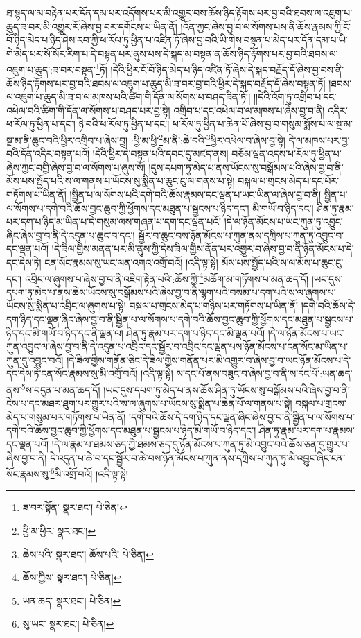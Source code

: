 ཐ་སྙད་ལ་མ་བརྟེན་པར་དོན་དམ་པར་འདོགས་པར་མི་འགྱུར་བས་ཆོས་ཉིད་རྟོགས་པར་བྱ་བའི་ཐབས་ལ་འཇུག་པ་ཆུད་ཟ་བར་མི་འགྱུར་རོ་ཞེས་བྱ་བར་དགོངས་པ་ཡིན་ནོ། །འོན་ཀྱང་ཞེས་བྱ་བ་ལ་སོགས་པས་ནི་ཆོས་རྣམས་ཀྱི་ངོ་བོ་ཉིད་མེད་པ་ཉིད་ཤེས་རབ་ཀྱི་ཕ་རོལ་ཏུ་ཕྱིན་པ་འཛིན་ཏོ་ཞེས་བྱ་བའི་ཡི་གེས་བསྟན་པ་མེད་པར་དོན་དམ་པ་ཡི་གེ་མེད་པར་སོ་སོར་རིག་པ་དེ་བསྟན་པར་ནུས་པས་དེ་སྐད་མ་བསྟན་ན་ཆོས་ཉིད་རྟོགས་པར་བྱ་བའི་ཐབས་ལ་འཇུག་པ་ཆུད་:ཟ་བར་བསྟན་\footnote{ཟ་བར་སྟོན་  སྣར་ཐང་།  པེ་ཅིན། }ཏོ། །དེའི་ཕྱིར་ངོ་བོ་ཉིད་མེད་པ་ཉིད་འཛིན་ཏོ་ཞེས་དེ་སྐད་བརྗོད་དོ་ཞེས་བྱ་བས་ནི་ཆོས་ཉིད་རྟོགས་པར་བྱ་བའི་ཐབས་ལ་འཇུག་པ་ཆུད་མི་ཟ་བར་བྱ་བའི་ཕྱིར་དེ་སྐད་བརྗོད་དོ་ཞེས་བསྟན་ཏོ། །ཐབས་ལ་འཇུག་པ་ཆུད་མི་ཟ་བ་ལ་མཁས་པའི་ཚིག་གི་དོན་ལ་སོགས་པ་བཤད་ཟིན་ཏོ།། །།དེའི་འོག་ཏུ་འགྲིབ་པ་དང་འཕེལ་བའི་ཚིག་གི་དོན་ལ་སོགས་པ་བཤད་པར་བྱ་སྟེ། འགྲིབ་པ་དང་འཕེལ་བ་ལ་མཁས་པ་ཞེས་བྱ་བ་ནི། འདིར་ཕ་རོལ་ཏུ་ཕྱིན་པ་དང་། ཉེ་བའི་ཕ་རོལ་ཏུ་ཕྱིན་པ་དང་། ཕ་རོལ་ཏུ་ཕྱིན་པ་ཆེན་པོ་ཞེས་བྱ་བ་གསུམ་སྨོས་པ་ལ་སྔ་མ་སྔ་མ་ནི་ཆུང་བའི་ཕྱིར་འགྲིབ་པ་ཞེས་བྱ། :ཕྱི་མ་ཕྱི་\footnote{ཕྱི་མ་ཕྱིར་  སྣར་ཐང་། }མ་ནི་:ཆེ་བའི་\footnote{ཆེས་པའི་  སྣར་ཐང་། ཆོས་པའི་  པེ་ཅིན། }ཕྱིར་འཕེལ་བ་ཞེས་བྱ་སྟེ། དེ་ལ་མཁས་པར་བྱ་བའི་དོན་འདིར་བསྟན་པའོ། །དེའི་ཕྱིར་དེ་བསྟན་པའི་དབང་དུ་མཛད་ནས། བཅོམ་ལྡན་འདས་ཕ་རོལ་ཏུ་ཕྱིན་པ་ཞེས་ཀྱང་བགྱི་ཞེས་བྱ་བ་ལ་སོགས་པ་ཞུས་སོ། །དུས་དཔག་ཏུ་མེད་པ་ནས་ཡོངས་སུ་བསྒོམས་པའི་ཞེས་བྱ་བ་ནི་མོས་པས་སྤྱོད་པའི་ས་ལ་གནས་པ་ཡོངས་སུ་སྨིན་པ་ཆུང་ངུ་ལ་གནས་པ་སྟེ། བསྐལ་པ་གྲངས་མེད་པ་དང་པོར་གཏོགས་པ་ཡིན་ནོ། །སྦྱིན་པ་ལ་སོགས་པའི་དགེ་བའི་ཆོས་རྣམས་དང་ལྡན་པ་ཡང་ཡིན་ལ་ཞེས་བྱ་བ་ནི། སྦྱིན་པ་ལ་སོགས་པ་དགེ་བའི་ཆོས་བྱང་ཆུབ་ཀྱི་ཕྱོགས་དང་མཐུན་པ་སྦྱངས་པ་ཉིད་དང་། མི་གཡོ་བ་ཉིད་དང་། ཤིན་ཏུ་རྣམ་པར་དག་པ་ཉིད་མ་ཡིན་པ་དེ་གསུམ་ལས་གཞན་པ་དག་དང་ལྡན་པའོ། །དེ་ལ་ཉོན་མོངས་པ་ཡང་ཀུན་ཏུ་འབྱུང་ཞིང་ཞེས་བྱ་བ་ནི་དེ་འདུན་པ་ཆུང་བ་དང་། སྦྱོར་བ་ཆུང་བས་ཉོན་མོངས་པ་ཀུན་ནས་དཀྲིས་པ་ཀུན་ཏུ་འབྱུང་བ་དང་ལྡན་པའོ། །དེ་ཟིལ་གྱིས་མནན་པར་མི་ནུས་ཀྱི་དེས་ཟིལ་གྱིས་ནོན་པར་འགྱུར་བ་ཞེས་བྱ་བ་ནི་ཉོན་མོངས་པ་དེ་དང་དེས་ཏེ། ངན་སོང་རྣམས་སུ་ཡང་ལན་འགའ་འགྲོ་བའོ། །འདི་ལྟ་སྟེ། མོས་པས་སྤྱོད་པའི་ས་ལ་མོས་པ་ཆུང་ངུ་དང་། འབྲིང་ལ་ཞུགས་པ་ཞེས་བྱ་བ་ནི་འཇིག་རྟེན་པའི་:ཆོས་ཀྱི་\footnote{ཆོས་ཀྱིས་  སྣར་ཐང་།  པེ་ཅིན། }མཆོག་མ་གཏོགས་པ་མན་ཆད་དོ། །ཡང་དུས་དཔག་ཏུ་མེད་པ་ནས་ཆེས་ཡོངས་སུ་བསྒོམས་པའི་ཞེས་བྱ་བ་ནི་ལྷག་པའི་བསམ་པ་དག་པའི་ས་ལ་ཞུགས་པ་ཡོངས་སུ་སྨིན་པ་འབྲིང་ལ་ཞུགས་པ་སྟེ། བསྐལ་པ་གྲངས་མེད་པ་གཉིས་པར་གཏོགས་པ་ཡིན་ནོ། །དགེ་བའི་ཆོས་དེ་དག་ཉིད་དང་ལྡན་ཞིང་ཞེས་བྱ་བ་ནི་སྦྱིན་པ་ལ་སོགས་པ་དགེ་བའི་ཆོས་བྱང་ཆུབ་ཀྱི་ཕྱོགས་དང་མཐུན་པ་སྦྱངས་པ་ཉིད་དང་མི་གཡོ་བ་ཉིད་དང་ནི་ལྡན་ལ། ཤིན་ཏུ་རྣམ་པར་དག་པ་ཉིད་དང་མི་ལྡན་པའོ། །དེ་ལ་ཉོན་མོངས་པ་ཡང་ཀུན་འབྱུང་ལ་ཞེས་བྱ་བ་ནི་དེ་འདུན་པ་འབྲིང་དང་སྦྱོར་བ་འབྲིང་དང་ལྡན་པས་ཉོན་མོངས་པ་ངན་སོང་མ་ཡིན་པ་ཀུན་དུ་འབྱུང་བའོ། །དེ་ཟིལ་གྱིས་གནོན་ཅིང་དེ་ཟིལ་གྱིས་གནོན་པར་མི་འགྱུར་བ་ཞེས་བྱ་བ་ཡང་ཉོན་མོངས་པ་དེ་དང་དེས་ཏེ་ངན་སོང་རྣམས་སུ་མི་འགྲོ་བའོ། །འདི་ལྟ་སྟེ། ས་དང་པོ་ནས་བཟུང་བ་ཞེས་བྱ་བ་ནི་ས་དང་པོ་:ཡན་ཆད་ནས་\footnote{ཡན་ཆད་  སྣར་ཐང་།  པེ་ཅིན། }ས་བདུན་པ་མན་ཆད་དོ། །ཡང་དུས་དཔག་ཏུ་མེད་པ་ནས་ཆོས་ཤིན་ཏུ་ཡོངས་སུ་བསྒོམས་པའི་ཞེས་བྱ་བ་ནི། ངེས་པ་དང་མཐར་ཐུག་པར་གྱུར་པའི་ས་ལ་ཞུགས་པ་ཡོངས་སུ་སྨིན་པ་ཆེན་པོ་ལ་གནས་པ་སྟེ། བསྐལ་པ་གྲངས་མེད་པ་གསུམ་པར་གཏོགས་པ་ཡིན་ནོ། །དགེ་བའི་ཆོས་དེ་དག་ཉིད་དང་ལྡན་ཞིང་ཞེས་བྱ་བ་ནི་སྦྱིན་པ་ལ་སོགས་པ་དགེ་བའི་ཆོས་བྱང་ཆུབ་ཀྱི་ཕྱོགས་དང་མཐུན་པ་སྦྱངས་པ་ཉིད་མི་གཡོ་བ་ཉིད་དང་། ཤིན་ཏུ་རྣམ་པར་དག་པ་རྣམས་དང་ལྡན་པའོ། །དེ་ལ་རྣམ་པ་ཐམས་ཅད་ཀྱི་ཐམས་ཅད་དུ་ཉོན་མོངས་པ་ཀུན་ཏུ་མི་འབྱུང་བའི་ཆོས་ཅན་དུ་གྱུར་པ་ཞེས་བྱ་བ་ནི། དེ་འདུན་པ་ཆེ་བ་དང་སྦྱོར་བ་ཆེ་བས་ཉོན་མོངས་པ་ཀུན་ནས་དཀྲིས་པ་ཀུན་ཏུ་མི་འབྱུང་ཞིང་ངན་སོང་རྣམས་སུ་\footnote{སུ་ཡང་  སྣར་ཐང་།  པེ་ཅིན། }མི་འགྲོ་བའོ། །འདི་ལྟ་སྟེ། 